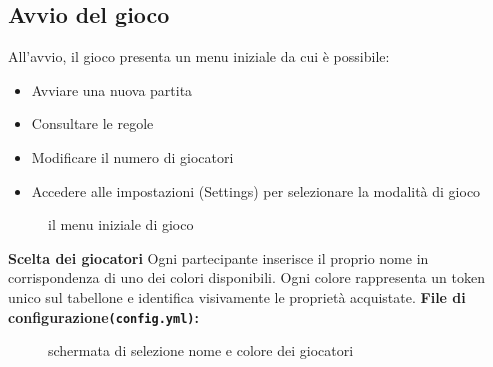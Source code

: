 \subsection{Avvio del gioco}
All’avvio, il gioco presenta un menu iniziale da cui è possibile:\newline
\begin{itemize}
    \item Avviare una nuova partita
    \item Consultare le regole
    \item Modificare il numero di giocatori
    \item Accedere alle impostazioni (Settings) per selezionare la modalità di gioco
\end{itemize}
\begin{figure}[H]
    \centering
    \caption{il menu iniziale di gioco}
	\label{img:gamescreen1}
\end{figure}
\textbf{Scelta dei giocatori}\newline
Ogni partecipante inserisce il proprio nome in corrispondenza di uno dei colori disponibili. Ogni colore rappresenta un token unico sul tabellone e identifica visivamente le proprietà acquistate.\newline
\textbf{File di configurazione\texttt{(config.yml)}:}\newline
\begin{figure}[H]
    \centering
    \caption{schermata di selezione nome e colore dei giocatori}
	\label{img:gamescreen2}
\end{figure}
